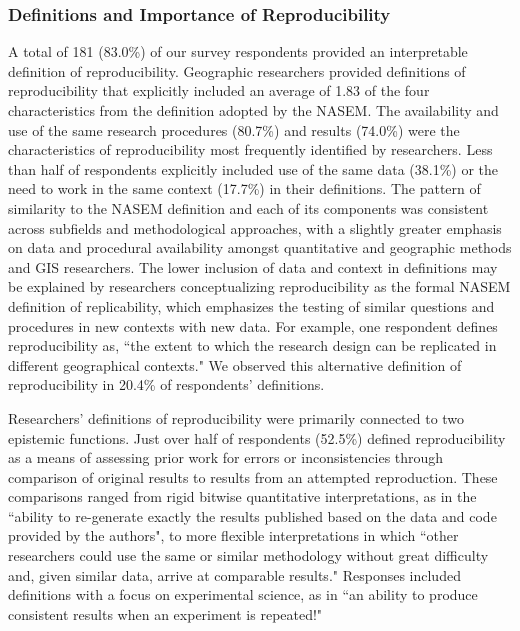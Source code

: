 \documentclass[]{interact}
\theoremstyle{plain}%
\theoremstyle{definition}
\theoremstyle{remark}
\begin{document}
\subsubsection*{Definitions and Importance of Reproducibility}
A total of 181 (83.0\%) of our survey respondents provided an interpretable definition of reproducibility.  
Geographic researchers provided definitions of reproducibility that explicitly included an average of 1.83 of the four characteristics from the definition adopted by the NASEM.
The availability and use of the same research procedures (80.7\%) and results (74.0\%) were the characteristics of reproducibility most frequently identified by researchers. 
Less than half of respondents explicitly included use of the same data (38.1\%) or the need to work in the same context (17.7\%) in their definitions. 
The pattern of similarity to the NASEM definition and each of its components was consistent across subfields and methodological approaches, with a slightly greater emphasis on data and procedural availability amongst quantitative and geographic methods and GIS researchers.
The lower inclusion of data and context in definitions may be explained by researchers conceptualizing reproducibility as the formal NASEM definition of replicability, which emphasizes the testing of similar questions and procedures in new contexts with new data. 
For example, one respondent defines reproducibility as, ``the extent to which the research design can be replicated in different geographical contexts."
We observed this alternative definition of reproducibility in 20.4\% of respondents' definitions.

Researchers' definitions of reproducibility were primarily connected to two epistemic functions.
Just over half of respondents (52.5\%) defined reproducibility as a means of assessing prior work for errors or inconsistencies through comparison of original results to results from an attempted reproduction.
These comparisons ranged from rigid bitwise quantitative interpretations, as in the ``ability to re-generate exactly the results published based on the data and code provided by the authors", to more flexible interpretations in which ``other researchers could use the same or similar methodology without great difficulty and, given similar data, arrive at comparable results."
Responses included definitions with a focus on experimental science, as in ``an ability to produce consistent results when an experiment is repeated!"
\end{document}
